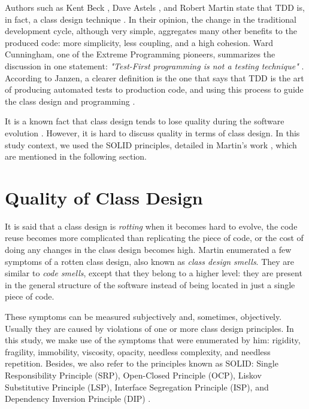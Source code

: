 \documentclass[times]{speauth}
\begin{document}
Authors such as Kent Beck \cite{aim-fire}, Dave Astels \cite{astels-tdd}, and
Robert Martin \cite{bob-martin} state that TDD is, in fact, a class design
technique \cite{tdd-taxonomy} \cite{aim-fire}.
In their opinion, the change in the traditional development cycle, although very simple,
aggregates many other benefits to the produced code: more simplicity, less coupling, and
a high cohesion. Ward Cunningham, one of the Extreme Programming pioneers, summarizes
the discussion in one statement: \textit{"Test-First programming is not a testing technique"} 
\cite{aim-fire}.
According to Janzen, a clearer definition is the one that says that TDD is the 
art of producing automated tests to production code, and using this process to guide
the class design and programming \cite{agilealliance-tdd} \cite{tdd-taxonomy}.

It is a known fact that class design tends to lose quality during the software evolution \cite{evolution-lehman}.
However, it is hard to discuss quality in terms of class design. In this study context,
we used the SOLID principles, detailed in Martin's work \cite{bob-martin}, which are
mentioned in the following section.

\section{Quality of Class Design}

It is said that a class design is \textit{rotting} when it becomes hard
to evolve, the code reuse becomes more complicated than replicating the piece
of code, or the cost of doing any changes in the class design becomes high.
Martin \cite{bob-martin} enumerated a few symptoms of a rotten class design,
also known as \textit{class design smells}. They are similar to \textit{code smells},
except that they belong to a higher level: they are present in the general structure
of the software instead of being located in just a single piece of code.

These symptoms can be measured subjectively and, sometimes, objectively. Usually
they are caused by violations of one or more class design principles.
In this study, we make use of the symptoms that were enumerated by him: 
rigidity, fragility, immobility, viscosity, opacity, needless complexity, and
needless repetition. Besides, we also refer to the principles known as SOLID:
Single Responsibility Principle (SRP), Open-Closed Principle (OCP),
Liskov Substitutive Principle (LSP), Interface Segregation Principle (ISP), and
Dependency Inversion Principle (DIP) \cite{bob-martin}.
\end{document}
